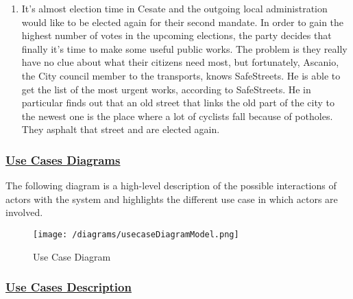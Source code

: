 \begin{enumerate}[label=\textbf{AS\arabic*}]
			\item \label{sce:advancedAuthority} It’s almost election time in Cesate and the outgoing local administration would like to be elected again for their second mandate. In order to gain the highest number of votes in the upcoming elections, the party decides that finally it’s time to make some useful public works. The problem is they really have no clue about what their citizens need most, but fortunately, Ascanio, the City council member to the transports, knows SafeStreets. He is able to get the list of the most urgent works, according to SafeStreets. He in particular finds out that an old street that links the old part of the city to the newest one is the place where a lot of cyclists fall because of potholes. They asphalt that street and are elected again.
		\end{enumerate}
	
		\newpage
		
	\subsubsection[Use Cases Diagrams]{\hyperlink{toc}{Use Cases Diagrams}}
		The following diagram is a high-level description of the possible interactions of actors with the system and highlights the different use case in which actors are involved.
		
		\begin{figure}[h!]
			\centering
			\texttt{[image: /diagrams/usecaseDiagramModel.png]}
			\caption{Use Case Diagram}
		\end{figure}
	
		\FloatBarrier
	
	\subsubsection[Use Cases Description]{\hyperlink{toc}{Use Cases Description}}
		\label{sec:useCases}
		
